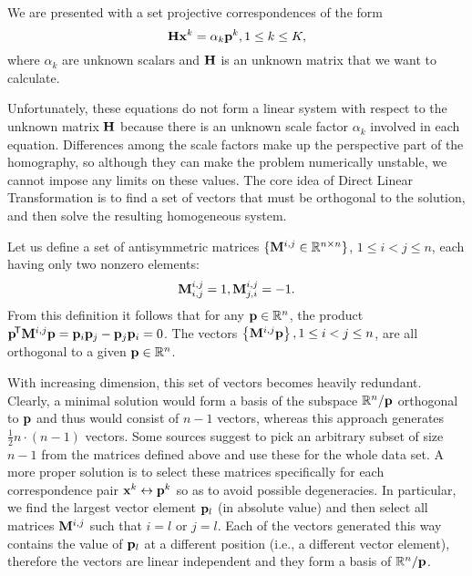 We are presented with a set projective correspondences of the form
$$\mathbf{H} \mathbf{x}^k = \alpha_k \mathbf{p}^k, 1 \leq k \leq K,$$
where $\alpha_k$ are unknown scalars and $\mathbf{H}$ is an unknown matrix that we want to calculate.

Unfortunately, these equations do not form a linear system with respect to the unknown matrix $\mathbf{H}$ because there is an unknown scale factor $\alpha_k$ involved in each equation.
Differences among the scale factors make up the perspective part of the homography, so although they can make the problem numerically unstable, we cannot impose any limits on these values.
The core idea of Direct Linear Transformation is to find a set of vectors that must be orthogonal to the solution, and then solve the resulting homogeneous system.

Let us define a set of antisymmetric matrices $\{\mathbf{M}^{i, j} \in \mathbb{R}^{n \times n}\}$, $1 \leq i < j \leq n$, each having only two nonzero elements:
$$\mathbf{M}^{i, j}_{i, j} = 1,
\mathbf{M}^{i, j}_{j, i} = -1.$$
From this definition it follows that for any $\mathbf{p} \in \mathbb{R}^n$, the product $\mathbf{p}^{\!\mathsf{T}} \mathbf{M}^{i, j} \mathbf{p} = \mathbf{p}_{i} \mathbf{p}_{j} - \mathbf{p}_{j} \mathbf{p}_{i} = 0$.
The vectors $\left\{ \mathbf{M}^{i, j} \mathbf{p} \right\}, 1 \leq i < j \leq n$, are all orthogonal to a given $\mathbf{p} \in \mathbb{R}^n$.

With increasing dimension, this set of vectors becomes heavily redundant.
Clearly, a minimal solution would form a basis of the subspace $\mathbb{R}^n / \mathbf{p}$ orthogonal to $\mathbf{p}$ and thus would consist of $n - 1$ vectors, whereas this approach generates $\frac {1} {2} n \cdot (n - 1)$ vectors.
Some sources\cite{MVG} suggest to pick an arbitrary subset of size $n - 1$ from the matrices defined above and use these for the whole data set.
A more proper solution is to select these matrices specifically for each correspondence pair $\mathbf{x}^k \leftrightarrow \mathbf{p}^k$ so as to avoid possible degeneracies.
In particular, we find the largest vector element $\mathbf{p}_l$ (in absolute value) and then select all matrices $\mathbf{M}^{i, j}$ such that $i = l$ or $j = l$.
Each of the vectors generated this way contains the value of $\mathbf{p}_l$ at a different position (i.e., a different vector element), therefore the vectors are linear independent and they form a basis of $\mathbb{R}^n / \mathbf{p}$.

